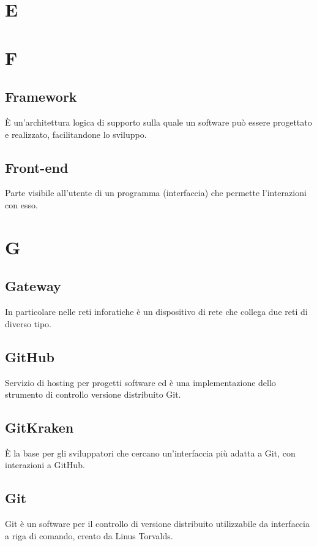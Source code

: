 \documentclass{classes/base}
\begin{document}
        \newpage  
    \section{E}
    
        \newpage  
    \section{F}
        \subsection*{Framework}
        È un'architettura logica di supporto sulla quale un software può essere progettato e realizzato, facilitandone lo sviluppo.
        
        \subsection*{Front-end}
        Parte visibile all'utente di un programma (interfaccia) che permette l'interazioni con esso.
        
        \newpage  
    \section{G}
        
        \subsection*{Gateway}
        In particolare nelle reti inforatiche è un dispositivo di rete che collega due reti di diverso tipo.

        \subsection*{GitHub}
        Servizio di hosting per progetti software ed è una implementazione dello strumento di controllo versione distribuito Git.

        \subsection*{GitKraken}
        È la base per gli sviluppatori che cercano un'interfaccia più adatta a Git, con interazioni a GitHub. 

        \subsection*{Git}
        Git è un software per il controllo di versione distribuito utilizzabile da interfaccia a riga di comando, creato da Linus Torvalds.
        
\end{document}
